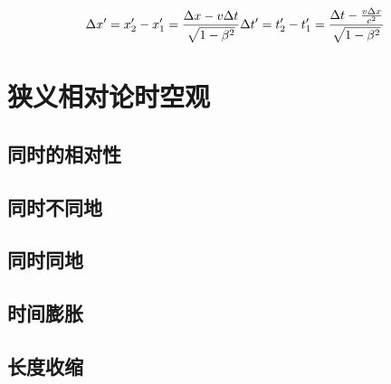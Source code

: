 \begin{equation}
    \Delta{x'}=x_2'-x_1'=\frac{\Delta{x}-v\Delta{t}}{\sqrt{1-\beta^2}}\\
    \Delta{t'}=t_2'-t_1'=\frac{\Delta{t}-\frac{v\Delta{x}}{c^2}}{\sqrt{1-\beta^2}}
\end{equation}

\section{狭义相对论时空观}

\subsection{同时的相对性}

\subsection{同时不同地}

\subsection{同时同地}

\subsection{时间膨胀}

\subsection{长度收缩}

\newpage
